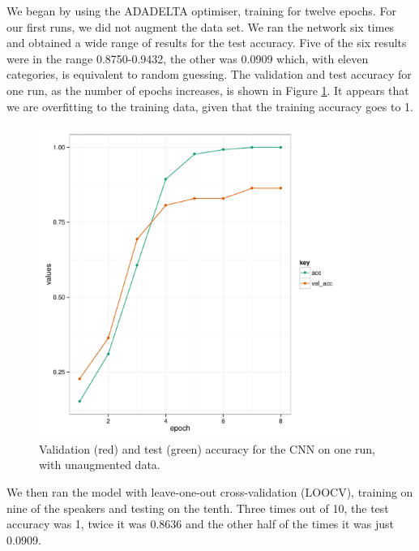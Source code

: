 We began by using the ADADELTA optimiser, training for twelve epochs. For our first runs, we did not augment the data set. We ran the network six times and obtained a wide range of results for the test accuracy. Five of the six results were in the range 0.8750-0.9432, the other was 0.0909 which, with eleven categories, is equivalent to random guessing. The validation and test accuracy for one run, as the number of epochs increases, is shown in Figure \ref{fig:2d_acc}. It appears that we are overfitting to the training data, given that the training accuracy goes to 1. 

\begin{figure}[h]
\begin{center}
\includegraphics[height = 4in, width = 4in]{cnn_2d_plot_acc.pdf}
\end{center}
\caption{Validation (red) and test (green) accuracy for the CNN on one run, with unaugmented data.}
\label{fig:2d_acc}
\end{figure}

We then ran the model with leave-one-out cross-validation (LOOCV), training on nine of the speakers and testing on the tenth. Three times out of 10, the test accuracy was 1, twice it was 0.8636 and the other half of the times it was just 0.0909.

